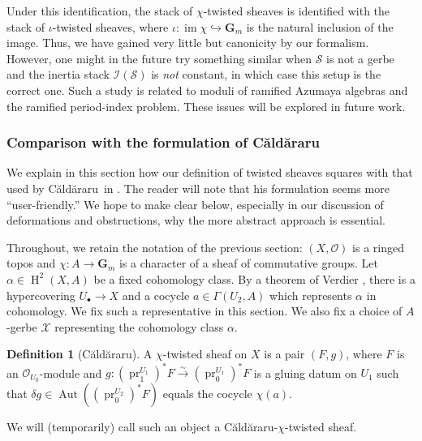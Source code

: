\documentclass[11pt]{amsart}
\newcommand{\Caldararu}{C\u ald\u araru}
\newcommand{\field}[1]{\mathbf #1}
\newcommand{\ms}[1]{\mathscr #1}
\newcommand{\simto}{\stackrel{\sim}{\to}}
\DeclareMathOperator{\pr}{pr}
\newcommand{\G}{\field G} %
\renewcommand{\H}{\operatorname{H}}
\renewcommand{\[}{[\!\hspace{0.03em}[}
\renewcommand{\]}{]\!\hspace{0.03em}]}
\renewcommand{\(}{(\!\hspace{0.03em}(}
\renewcommand{\)}{)\!\hspace{0.03em})}
\newcommand{\im}{\operatorname{im}}
\newcommand{\inj}{\hookrightarrow}
\DeclareMathOperator{\aut}{\operatorname{Aut}}
\theoremstyle{definition}
\newtheorem{defn}[lem]{Definition}
\theoremstyle{remark}
\begin{document}
Under this identification, the stack of $\chi$-twisted sheaves is 
identified with the stack of $\iota$-twisted sheaves, where 
$\iota:\im\chi\inj\G_{m}$ is the natural inclusion of the image.  
Thus, we have gained very little but canonicity by our formalism.  
However, one might in the future try something similar when $\ms S$ 
is not a gerbe and the 
inertia stack $\ms I(\ms S)$ is \emph{not\/} constant, in which case 
this setup is the correct one.  Such a study is related to moduli of 
ramified Azumaya algebras and the ramified period-index problem.  
These issues will be explored in future work.



\subsubsection{Comparison with the formulation of 
\Caldararu}\label{S:cald comp}
We explain in this section how our definition of twisted sheaves 
squares with that used by \Caldararu\ in \cite{caldararu}.  The reader will note 
that his formulation seems more ``user-friendly.''  We hope to make 
clear below, especially in our discussion of deformations and 
obstructions, why the more abstract approach is essential.

Throughout, we retain the notation of the previous section: $(X,{\ms O})$ 
is a ringed topos and $\chi:A\to\G_{m}$ is a character of a sheaf of 
commutative groups.  Let 
$\alpha\in\H^{2}(X,A)$ be a fixed cohomology class.  By a theorem of 
Verdier \cite[Expos\'e V.7]{sga4-2}, there is a hypercovering $U_{\bullet}\to X$ and a cocycle 
$a\in\Gamma(U_{2},A)$  
which represents $\alpha$ in cohomology.  We fix such a 
representative in this section.  We also fix a choice 
of $A$-gerbe $\ms X$ representing the cohomology class $\alpha$.

\begin{defn}[\Caldararu] A $\chi$-twisted sheaf on $X$ is a pair 
$(F,g)$, where $F$ is an ${\ms O}_{U_{0}}$-module and $g:(\pr_1^{U_1})^{\ast}F\simto(\pr_0^{U_1})^{\ast}F$ 
is a gluing datum on $U_{1}$ such that $\delta g\in\aut((\pr_0^{U_2})^{\ast}F)$ 
equals the cocycle $\chi(a)$.
\end{defn}
We will (temporarily) call such an object a \Caldararu-$\chi$-twisted 
sheaf.
\end{document}
